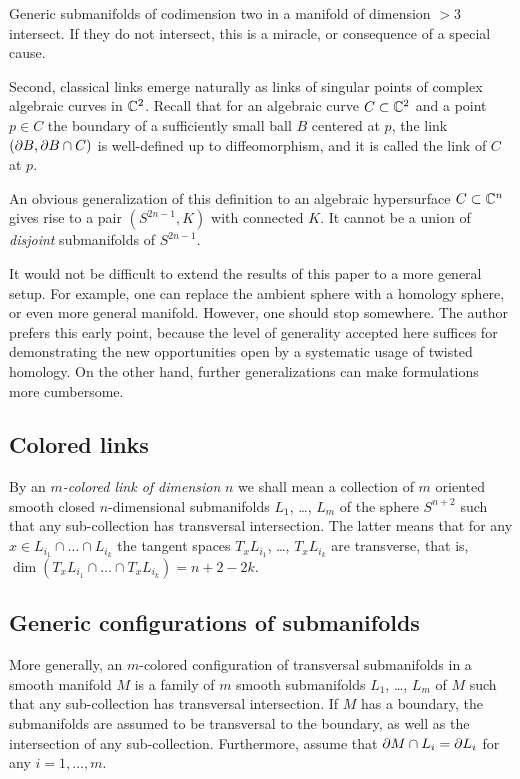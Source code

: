 \documentclass{article}
\numberwithin{equation}{section}
\begin{document}
Generic submanifolds of codimension two in a manifold
of dimension $>3$ intersect. If they do {\sfit not\/} intersect, this
is a miracle, or consequence of a special cause. 

Second, classical links emerge naturally as links of 
singular points
of complex algebraic curves in $\mathbb C^2$. Recall that for an
algebraic curve $C\subset\mathbb C^2$ and a point $p\in C$ the
boundary of a sufficiently small ball $B$ centered at $p$, 
the link $(\partial B,\partial B\cap C)$ is  well-defined up to 
diffeomorphism, and it is called the {\sfit link of
$C$ at $p$}. 

An obvious generalization of this definition to an
algebraic hypersurface $C\subset\mathbb C^n$ gives rise to 
a pair $(S^{2n-1},K)$ with connected $K$. It cannot be
a union of {\it disjoint\/} submanifolds of $S^{2n-1}$.

It would not be difficult to extend the results of this paper 
to a more general setup. For example, one can replace the ambient
sphere with a homology sphere, or even more general manifold.
However, one should stop somewhere. The author prefers this early
point, because the level of generality accepted here suffices for
demonstrating the new opportunities open by a systematic usage of
twisted homology. On the other hand, further generalizations 
can make formulations more cumbersome. 


\subsection{Colored links}\label{s3.2}
By an {\sl $m$-colored link of dimension\/} $n$ we shall mean a collection
of $m$ oriented smooth closed $n$-dimensional submanifolds $L_1$, \dots, 
$L_m$ of the sphere $S^{n+2}$ such that any sub-collection has 
transversal intersection. The latter means that for any 
$x\in L_{i_1}\cap\dots\cap L_{i_k}$ the tangent spaces $T_xL_{i_1}$, \dots,
$T_xL_{i_k}$ are transverse, that is, $\dim(T_xL_{i_1}\cap\dots\cap
T_xL_{i_k})=n+2-2k$. 

\subsection{Generic configurations of submanifolds}\label{s3.3}
More generally, an $m$-colo\-red configuration of transversal submanifolds
in a smooth manifold $M$ is a family of $m$  smooth
submanifolds $L_1$, \dots, $L_m$ of $M$ such that any sub-collection has
transversal intersection. If $M$ has a boundary, the submanifolds are
assumed to be transversal to the boundary, as well as the intersection of
any sub-collection. Furthermore, assume that $\partial M\cap L_i=\partial L_i$ for any
$i=1,\dots,m$.   
\end{document}
